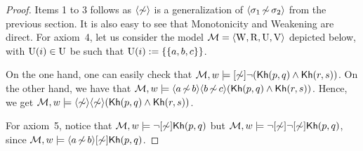 \begin{proof}
Items 1 to 3 follows as $\langle \not\sim \rangle$ is a generalization of $\langle \sigma_1{\,\not\sim\,}\sigma_2 \rangle$ from the previous section. 
It is also easy to see that Monotonicity and Weakening are direct. For axiom~4, let us consider the model $\mathcal{M} = \langle \operatorname{W},\operatorname{R},\operatorname{U},\operatorname{V} \rangle$ depicted below, with $\operatorname{U}(i)\in\operatorname{U}$ be such that $\operatorname{U}(i):=\{ \{ a,b,c \} \}$.
\begin{center}
\end{center}

On the one hand, one can easily check that $\mathcal{M},w\models[\not\sim]\neg({\sf Kh}(p,q) \wedge {\sf Kh}(r,s))$. On the other hand, we have that $\mathcal{M},w\models\langle a{\,\not\sim\,}b \rangle\langle b{\,\not\sim\,}c \rangle ({\sf Kh}(p,q) \wedge {\sf Kh}(r,s))$. Hence, we get $\mathcal{M},w\models\langle \not\sim \rangle\langle \not\sim \rangle({\sf Kh}(p,q) \wedge {\sf Kh}(r,s))$.

For axiom~5, notice that $\mathcal{M},w \models \neg[\not\sim] {\sf Kh}(p,q)$ but $\mathcal{M},w \models \neg[\not\sim]\neg[\not\sim] {\sf Kh}(p,q)$, since $\mathcal{M},w \models \langle a{\,\not\sim\,}b \rangle[\not\sim] {\sf Kh}(p,q)$.
\end{proof}

